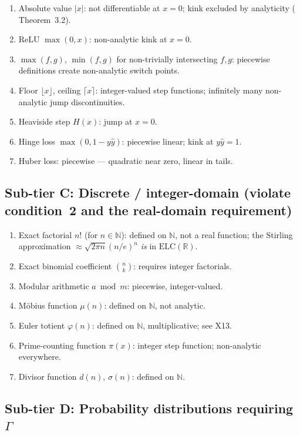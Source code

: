 \documentclass[12pt,a4paper]{article}
\theoremstyle{definition}
\newcommand{\ELC}{\mathrm{ELC}(\mathbb{R})}
\newcommand{\N}{\mathbb{N}}
\begin{document}
\begin{enumerate}[label=\textbf{B\arabic*.}, leftmargin=*, itemsep=6pt]
\item Absolute value $|x|$: not differentiable at $x=0$; kink excluded by
  analyticity (\cite{F16} Theorem~3.2).
\item ReLU $\max(0,x)$: non-analytic kink at $x=0$.
\item $\max(f,g)$, $\min(f,g)$ for non-trivially intersecting $f,g$:
  piecewise definitions create non-analytic switch points.
\item Floor $\lfloor x\rfloor$, ceiling $\lceil x\rceil$: integer-valued
  step functions; infinitely many non-analytic jump discontinuities.
\item Heaviside step $H(x)$: jump at $x=0$.
\item Hinge loss $\max(0, 1-y\hat y)$: piecewise linear; kink at $y\hat y=1$.
\item Huber loss: piecewise --- quadratic near zero, linear in tails.
\end{enumerate}

\subsection{Sub-tier C: Discrete / integer-domain (violate condition~2 and the real-domain requirement)}

\begin{enumerate}[label=\textbf{C\arabic*.}, leftmargin=*, itemsep=6pt]
\item Exact factorial $n!$ (for $n\in\N$): defined on $\N$, not a real function;
  the Stirling approximation $\approx\sqrt{2\pi n}(n/e)^n$ \emph{is} in $\ELC$.
\item Exact binomial coefficient $\binom{n}{k}$: requires integer factorials.
\item Modular arithmetic $a \bmod m$: piecewise, integer-valued.
\item M\"obius function $\mu(n)$: defined on $\N$, not analytic.
\item Euler totient $\varphi(n)$: defined on $\N$, multiplicative; see X13.
\item Prime-counting function $\pi(x)$: integer step function; non-analytic
  everywhere.
\item Divisor function $d(n)$, $\sigma(n)$: defined on $\N$.
\end{enumerate}

\subsection{Sub-tier D: Probability distributions requiring \texorpdfstring{$\Gamma$}{Gamma}}
\end{document}
